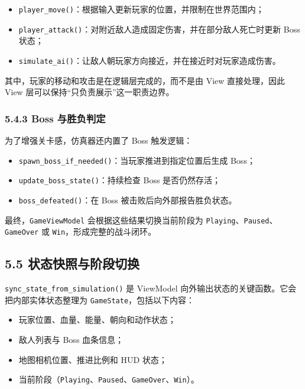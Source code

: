 \documentclass[12pt,fontset=none]{ctexart}
\begin{document}
\begin{itemize}
\item \texttt{player\_move()}：根据输入更新玩家的位置，并限制在世界范围内；
\item \texttt{player\_attack()}：对附近敌人造成固定伤害，并在部分敌人死亡时更新 Boss 状态；
\item \texttt{simulate\_ai()}：让敌人朝玩家方向接近，并在接近时对玩家造成伤害。
\end{itemize}

其中，玩家的移动和攻击是在逻辑层完成的，而不是由 View 直接处理，因此 View 层可以保持“只负责展示”这一职责边界。

\subsubsection{5.4.3 Boss 与胜负判定}

为了增强关卡感，仿真器还内置了 Boss 触发逻辑：

\begin{itemize}
\item \texttt{spawn\_boss\_if\_needed()}：当玩家推进到指定位置后生成 Boss；
\item \texttt{update\_boss\_state()}：持续检查 Boss 是否仍然存活；
\item \texttt{boss\_defeated()}：在 Boss 被击败后向外部报告胜负状态。
\end{itemize}

最终，\texttt{GameViewModel} 会根据这些结果切换当前阶段为 \texttt{Playing}、\texttt{Paused}、\texttt{GameOver} 或 \texttt{Win}，形成完整的战斗闭环。

\subsection{5.5 状态快照与阶段切换}

\texttt{sync\_state\_from\_simulation()} 是 ViewModel 向外输出状态的关键函数。它会把内部实体状态整理为 \texttt{GameState}，包括以下内容：

\begin{itemize}
\item 玩家位置、血量、能量、朝向和动作状态；
\item 敌人列表与 Boss 血条信息；
\item 地图相机位置、推进比例和 HUD 状态；
\item 当前阶段（\texttt{Playing}、\texttt{Paused}、\texttt{GameOver}、\texttt{Win}）。
\end{itemize}
\end{document}
